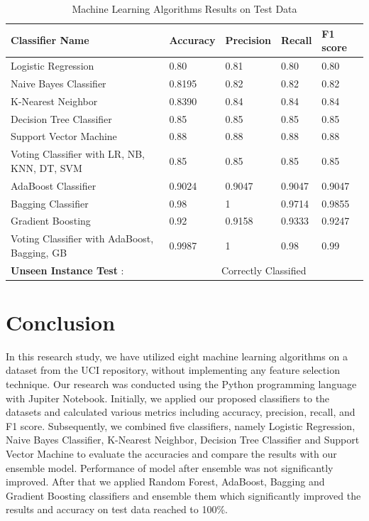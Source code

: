 \documentclass[journal, twoside, final]{IEEEtran}
\begin{document}
\begin{table}[htbp]
  \centering
  \caption{Machine Learning Algorithms Results on Test Data}
  \begin{tabular}{|p{2cm}|p{0.95cm}|p{1cm}|p{1cm}|p{1cm}|}
    \hline
    \textbf{Classifier Name} & \textbf{Accuracy} & \textbf{Precision} & \textbf{Recall} & \textbf{F1 score} \\
    \hline
    {Logistic Regression} & {0.80} & {0.81} & {0.80} & {0.80} \\
 \hline
    Naive Bayes Classifier & 0.8195 & 0.82 & 0.82 & 0.82 \\
 \hline
    K-Nearest Neighbor & 0.8390 & 0.84 & 0.84 & 0.84 \\
 \hline
    Decision Tree Classifier & 0.85 & 0.85 & 0.85 & 0.85 \\
 \hline
    Support Vector Machine & 0.88 & 0.88 & 0.88 & 0.88 \\
 \hline
   {Voting Classifier with LR, NB, KNN, DT, SVM} & {0.85} & {0.85} & {0.85} & {0.85} \\
 \hline
    AdaBoost Classifier & 0.9024 & 0.9047 & 0.9047 & 0.9047 \\
 \hline
    Bagging Classifier & 0.98 & 1 & 0.9714 & 0.9855 \\
 \hline
    Gradient Boosting & 0.92 & 0.9158 & 0.9333 & 0.9247 \\
 \hline
   {Voting Classifier with AdaBoost, Bagging, GB} & {0.9987} & {1} & {0.98} & {0.99} \\
 \hline
   \textbf{Unseen Instance Test} : & \multicolumn{4}{|c|}{Correctly Classified} \\
    \hline
  \end{tabular}
\end{table}

\section{Conclusion}
In this research study, we have utilized eight machine learning algorithms on a dataset from the UCI repository, without implementing any feature selection technique.  Our research was conducted using the Python programming language with Jupiter Notebook. Initially, we applied our proposed classifiers to the datasets and calculated various metrics including accuracy, precision, recall, and F1 score. Subsequently, we combined five classifiers, namely Logistic Regression, Naive Bayes Classifier, K-Nearest Neighbor, Decision Tree Classifier and Support Vector Machine to evaluate the accuracies and compare the results with our ensemble model. Performance of model after ensemble was not significantly improved. After that we applied Random Forest, AdaBoost, Bagging and Gradient Boosting classifiers and ensemble them which significantly improved the results and accuracy on test data reached to 100\%. 
\end{document}
